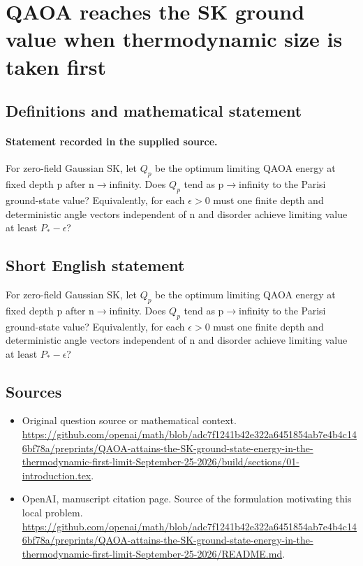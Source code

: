 \documentclass[11pt]{article}
\begin{document}
\section*{QAOA reaches the SK ground value when thermodynamic size is taken first}\label{30007244}
\subsection{Definitions and mathematical statement}
\paragraph{Statement recorded in the supplied source.}
For zero-field Gaussian SK, let $Q_p$ be the optimum limiting QAOA energy at fixed depth p after n$\to$infinity. Does $Q_p$ tend as p$\to$infinity to the Parisi ground-state value? Equivalently, for each $\epsilon >0$ must one finite depth and deterministic angle vectors independent of n and disorder achieve limiting value at least $P_*-\epsilon $?
\subsection{Short English statement}
For zero-field Gaussian SK, let $Q_p$ be the optimum limiting QAOA energy at fixed depth p after n$\to$infinity. Does $Q_p$ tend as p$\to$infinity to the Parisi ground-state value? Equivalently, for each $\epsilon >0$ must one finite depth and deterministic angle vectors independent of n and disorder achieve limiting value at least $P_*-\epsilon $?
\subsection{Sources}
\begin{itemize}
\item[S1] Original question source or mathematical context.
\url{https://github.com/openai/math/blob/adc7f1241b42e322a6451854ab7e4b4c146bf78a/preprints/QAOA-attains-the-SK-ground-state-energy-in-the-thermodynamic-first-limit-September-25-2026/build/sections/01-introduction.tex}.
\item[S2] OpenAI, manuscript citation page. Source of the formulation motivating this local problem.
\url{https://github.com/openai/math/blob/adc7f1241b42e322a6451854ab7e4b4c146bf78a/preprints/QAOA-attains-the-SK-ground-state-energy-in-the-thermodynamic-first-limit-September-25-2026/README.md}.
\end{itemize}
\end{document}
